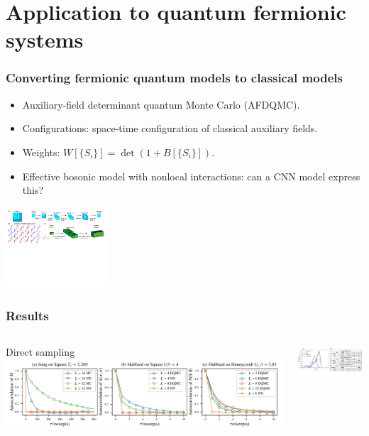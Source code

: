 \documentclass[xcolor=table, 10pt, aspectratio=169, ignorenonframetext]{beamer}
\begin{document}
\section{Application to quantum fermionic systems}

\begin{frame}
	\frametitle{Converting fermionic quantum models to classical models}
	\begin{itemize}
		\item Auxiliary-field determinant quantum Monte Carlo (AFDQMC).
		\item Configurations: space-time configuration of classical auxiliary fields.
		\item Weights: $W[\{S_i\}] = \det (1 + B[\{S_i\}])$.
		\item Effective bosonic model with nonlocal interactions: can a CNN model express this?
	\end{itemize}
	\begin{center}
		\includegraphics[height=3cm]{nn-model2}
	\end{center}
\end{frame}

\begin{frame}
	\frametitle{Results}
	\begin{columns}
		\begin{center}
			Direct sampling
			\includegraphics{autocorr-c}
		\end{center}
		\begin{center}
			\includegraphics[width=7cm]{corr-2}
		\end{center}

	\end{columns}
\end{frame}
\end{document}
